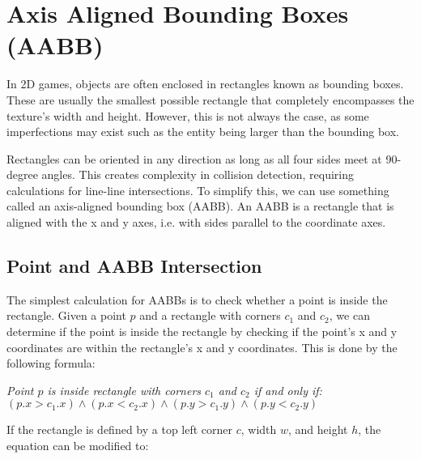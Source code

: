 \section{Axis Aligned Bounding Boxes (AABB)}
In 2D games, objects are often enclosed in rectangles known as bounding boxes.
These are usually the smallest possible rectangle that completely encompasses
the texture's width and height. However, this is not always the case, as some
imperfections may exist such as the entity being larger than the bounding box.

Rectangles can be oriented in any direction as long as all four sides meet at
90-degree angles. This creates complexity in collision detection, requiring
calculations for line-line intersections. To simplify this, we can use
something called an axis-aligned bounding box (AABB). An AABB is a rectangle
that is aligned with the x and y axes, i.e. with sides parallel to the
coordinate axes.

\subsection{Point and AABB Intersection}

The simplest calculation for AABBs is to check whether a point is inside the
rectangle. Given a point $p$ and a rectangle with corners $c_1$ and $c_2$, we
can determine if the point is inside the rectangle by checking if the point's x
and y coordinates are within the rectangle's x and y coordinates. This is done
by the following formula:
\begin{center}
    \textit{Point $p$ is inside rectangle with corners $c_1$ and $c_2$ if and only if:} \\
    $(p.x > c_1.x) \land (p.x < c_2.x) \land (p.y > c_1.y) \land (p.y < c_2.y)$
\end{center}

If the rectangle is defined by a top left corner $c$, width $w$, and height
$h$, the equation can be modified to:

